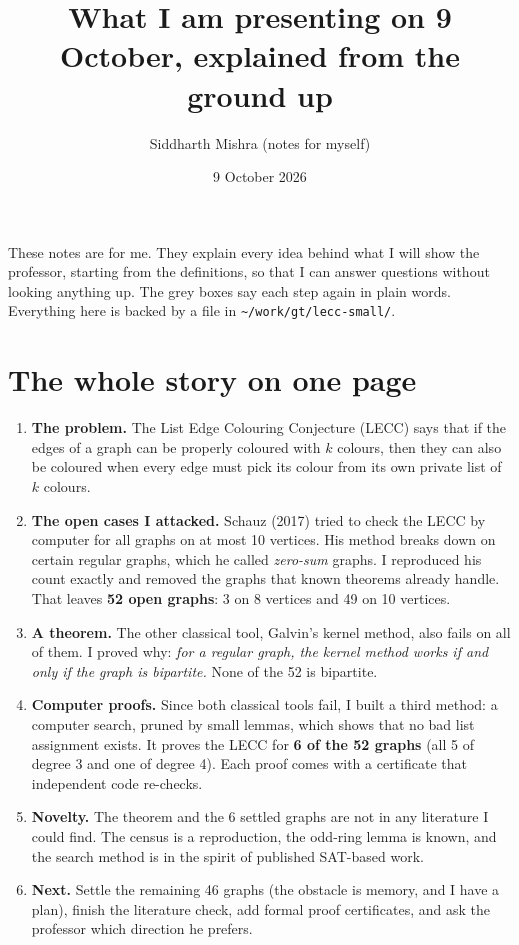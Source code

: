 \documentclass[11pt]{article}
\title{What I am presenting on 9 October, explained from the ground up}
\author{Siddharth Mishra (notes for myself)}
\date{9 October 2026}
\theoremstyle{plain}
\theoremstyle{definition}
\begin{document}
\maketitle

\noindent These notes are for me. They explain every idea behind what I will show the professor,
starting from the definitions, so that I can answer questions without looking anything up. The
grey boxes say each step again in plain words. Everything here is backed by a file in
\texttt{\textasciitilde/work/gt/lecc-small/}.

\tableofcontents

\section{The whole story on one page}

\begin{enumerate}[leftmargin=*]
  \item \textbf{The problem.} The List Edge Colouring Conjecture (LECC) says that if the edges of a
        graph can be properly coloured with $k$ colours, then they can also be coloured when
        every edge must pick its colour from its own private list of $k$ colours.
  \item \textbf{The open cases I attacked.} Schauz (2017) tried to check the LECC by computer for
        all graphs on at most 10 vertices. His method breaks down on certain regular graphs, which
        he called \emph{zero-sum} graphs. I reproduced his count exactly and removed the graphs
        that known theorems already handle. That leaves \textbf{52 open graphs}: 3 on 8 vertices
        and 49 on 10 vertices.
  \item \textbf{A theorem.} The other classical tool, Galvin's kernel method, also fails on all of
        them. I proved why: \emph{for a regular graph, the kernel method works if and only if the
        graph is bipartite.} None of the 52 is bipartite.
  \item \textbf{Computer proofs.} Since both classical tools fail, I built a third method: a
        computer search, pruned by small lemmas, which shows that no bad list assignment
        exists. It proves the LECC for \textbf{6 of the 52 graphs} (all 5 of degree 3 and one of
        degree 4). Each proof comes with a certificate that independent code re-checks.
  \item \textbf{Novelty.} The theorem and the 6 settled graphs are not in any literature I could
        find. The census is a reproduction, the odd-ring lemma is known, and the search method is
        in the spirit of published SAT-based work.
  \item \textbf{Next.} Settle the remaining 46 graphs (the obstacle is memory, and I have a
        plan), finish the literature check, add formal proof certificates, and ask the professor
        which direction he prefers.
\end{enumerate}
\end{document}
